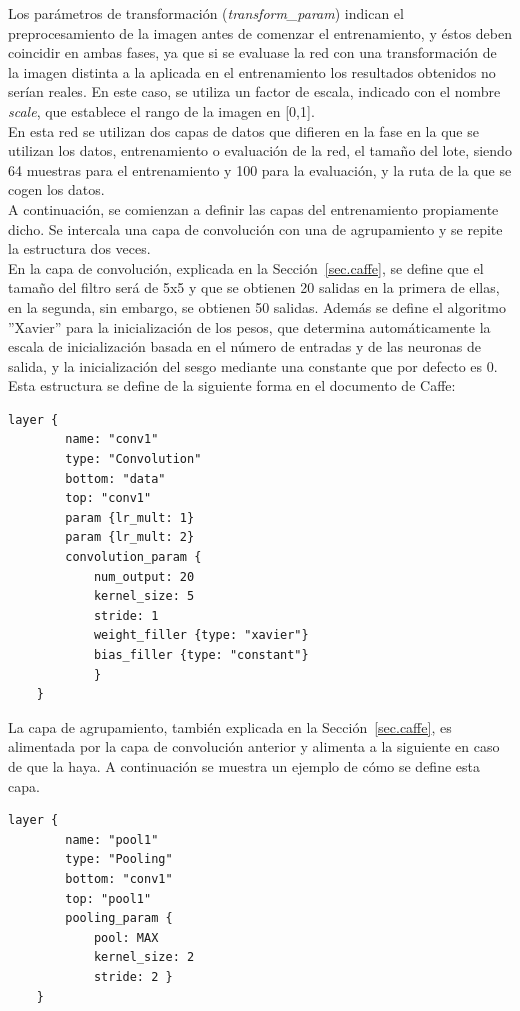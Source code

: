 	Los parámetros de transformación (\textit{transform\_param}) indican el preprocesamiento de la imagen antes de comenzar el entrenamiento, y éstos deben coincidir en ambas fases, ya que si se evaluase la red con una transformación de la imagen distinta a la aplicada en el entrenamiento los resultados obtenidos no serían reales. En este caso, se utiliza un factor de escala, indicado con el nombre \textit{scale}, que establece el rango de la imagen en [0,1]. \\
	En esta red se utilizan dos capas de datos que difieren en la fase en la que se utilizan los datos, entrenamiento o evaluación de la red, el tamaño del lote, siendo 64 muestras para el entrenamiento y 100 para la evaluación, y la ruta de la que se cogen los datos.\\
	
	A continuación, se comienzan a definir las capas del entrenamiento propiamente dicho. Se intercala una capa de convolución con una de agrupamiento y se repite la estructura dos veces.\\
	
	En la capa de convolución, explicada en la Sección~\ref{sec.caffe}, se define que el tamaño del filtro será de 5x5 y que se obtienen 20 salidas en la primera de ellas, en la segunda, sin embargo, se obtienen 50 salidas. Además se define el algoritmo ''Xavier'' para la inicialización de los pesos, que determina automáticamente la escala de inicialización basada en el número de entradas y de las neuronas de salida, y la inicialización del sesgo mediante una constante que por defecto es 0. Esta estructura se define de la siguiente forma en el documento de Caffe:
	\vspace{20pt}
	\begin{lstlisting}[frame=single]
	layer {
		name: "conv1"
		type: "Convolution"
		bottom: "data"
		top: "conv1"
		param {lr_mult: 1}
		param {lr_mult: 2}
		convolution_param {
			num_output: 20
			kernel_size: 5
			stride: 1
			weight_filler {type: "xavier"}
			bias_filler {type: "constant"}
			}
	}	
	\end{lstlisting}
	
	La capa de agrupamiento, también explicada en la Sección~\ref{sec.caffe}, es alimentada por la capa de convolución anterior y alimenta a la siguiente en caso de que la haya. A continuación se muestra un ejemplo de cómo se define esta capa.
	\vspace{10pt}
	\begin{lstlisting}[frame=single]
	layer {
		name: "pool1"
		type: "Pooling"
		bottom: "conv1"
		top: "pool1"
		pooling_param {
			pool: MAX
			kernel_size: 2
			stride: 2 }
	}	
	\end{lstlisting}
	
